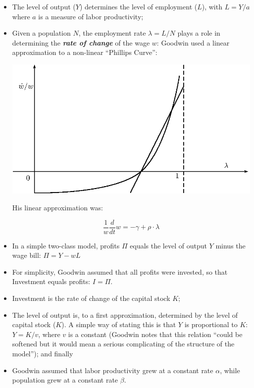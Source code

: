 \begin{itemize}

\item The level of output ($Y$) determines the level of employment ($L$), with $L=Y/a$ where $a$ is a measure of labor productivity;
\item Given a population $N$, the employment rate $\lambda=L/N$ plays
a role in determining the {\bf\em rate of change} of the wage $w$:
Goodwin used a linear approximation to a non-linear ``Phillips
Curve'': 

\begin{center}
  \includegraphics{images/PhillipsCurve.eps}
\end{center}

His linear approximation was:

\begin{displaymath}
\frac1w\frac{d}{dt}w=-\gamma+\rho\cdot\lambda
\end{displaymath}

\item In a simple two-class model, profits $\Pi$ equals the level of
output $Y$ minus the wage bill: $\Pi=Y-wL$ 
\item For simplicity, Goodwin assumed that all profits were invested, so that Investment equals profits: $I=\Pi$.
\item Investment is the rate of change of the capital stock $K$;
\item The level of output is, to a first approximation, determined by
the level of capital stock ($K$). A simple way of stating this is that
$Y$ is proportional to $K$: $Y=K/v$, where $v$ is a constant (Goodwin
notes that this relation ``could be softened but it would mean a
serious complicating of the structure of the model''); and finally 
\item Goodwin assumed that labor productivity grew at a constant rate $\alpha$, while population grew at a constant rate $\beta$.


\end{itemize}
